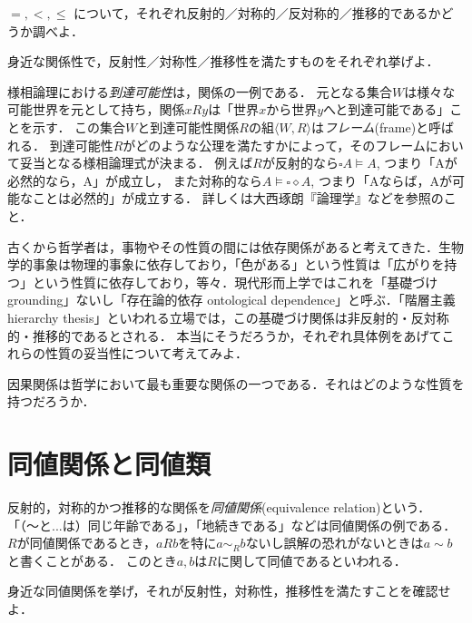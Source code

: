 \documentclass[11pt,a4paper]{jsarticle} %
\begin{document}
\begin{exercise}
 $=, <, \leq$ について，それぞれ反射的／対称的／反対称的／推移的であるかどうか調べよ．
\end{exercise}

\begin{exercise}
 身近な関係性で，反射性／対称性／推移性を満たすものをそれぞれ挙げよ．
\end{exercise}

\begin{example}
様相論理における\emph{到達可能性}は，関係の一例である．
元となる集合$W$は様々な可能世界を元として持ち，関係$xRy$は「世界$x$から世界$y$へと到達可能である」ことを示す．
この集合$W$と到達可能性関係$R$の組$\langle W, R \rangle$は\emph{フレーム}(frame)と呼ばれる．
到達可能性$R$がどのような公理を満たすかによって，そのフレームにおいて妥当となる様相論理式が決まる．
例えば$R$が反射的なら$\square A \models A$, つまり「Aが必然的なら，A」が成立し，
また対称的なら$A \models \square \diamond A$, つまり「Aならば，Aが可能なことは必然的」が成立する．
詳しくは大西琢朗『論理学』などを参照のこと．
\end{example}


\begin{example}
 古くから哲学者は，事物やその性質の間には依存関係があると考えてきた．生物学的事象は物理的事象に依存しており，「色がある」という性質は「広がりを持つ」という性質に依存しており，等々．現代形而上学ではこれを「基礎づけ grounding」ないし「存在論的依存 ontological dependence」と呼ぶ．「階層主義 hierarchy thesis」といわれる立場では，この基礎づけ関係は非反射的・反対称的・推移的であるとされる．
本当にそうだろうか，それぞれ具体例をあげてこれらの性質の妥当性について考えてみよ．
\end{example}

\begin{example}
 因果関係は哲学において最も重要な関係の一つである．それはどのような性質を持つだろうか．
\end{example}


\section{同値関係と同値類}
反射的，対称的かつ推移的な関係を\emph{同値関係}(equivalence relation)という．
「（〜と...は）同じ年齢である」，「地続きである」などは同値関係の例である．
$R$が同値関係であるとき，$aRb$を特に$a\sim_R b$ないし誤解の恐れがないときは$a \sim b$と書くことがある．
このとき$a,b$は$R$に関して同値であるといわれる．

\begin{exercise}
 身近な同値関係を挙げ，それが反射性，対称性，推移性を満たすことを確認せよ．
\end{exercise}
\end{document}
